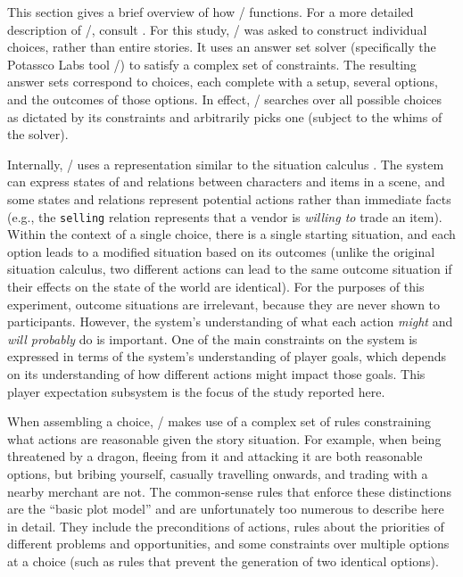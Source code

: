 This section gives a brief overview of how \dunyazad/ functions.
%
For a more detailed description of \dunyazad/, consult \citep{Mawhorter2015}.
%
For this study, \dunyazad/ was asked to construct individual choices, rather than entire stories.
%
It uses an answer set solver (specifically the Potassco Labs tool \clingo/) to satisfy a complex set of constraints.
%
The resulting answer sets correspond to choices, each complete with a setup, several options, and the outcomes of those options.
%
In effect, \dunyazad/ searches over all possible choices as dictated by its constraints and arbitrarily picks one (subject to the whims of the solver).


Internally, \dunyazad/ uses a representation similar to the situation calculus \citep{McCarthy1963}.
%
The system can express states of and relations between characters and items in a scene, and some states and relations represent potential actions rather than immediate facts (e.g., the \texttt{selling} relation represents that a vendor is \textsl{willing to} trade an item).
%
Within the context of a single choice, there is a single starting situation, and each option leads to a modified situation based on its outcomes (unlike the original situation calculus, two different actions can lead to the same outcome situation if their effects on the state of the world are identical).
%
For the purposes of this experiment, outcome situations are irrelevant, because they are never shown to participants.
%
However, the system's understanding of what each action \textsl{might} and \textsl{will probably} do is important.
%
One of the main constraints on the system is expressed in terms of the system's understanding of player goals, which depends on its understanding of how different actions might impact those goals.
%
This player expectation subsystem is the focus of the study reported here.


When assembling a choice, \dunyazad/ makes use of a complex set of rules constraining what actions are reasonable given the story situation.
%
For example, when being threatened by a dragon, fleeing from it and attacking it are both reasonable options, but bribing yourself, casually travelling onwards, and trading with a nearby merchant are not.
%
The common-sense rules that enforce these distinctions are the ``basic plot model'' and are unfortunately too numerous to describe here in detail.
%
They include the preconditions of actions, rules about the priorities of different problems and opportunities, and some constraints over multiple options at a choice (such as rules that prevent the generation of two identical options).


